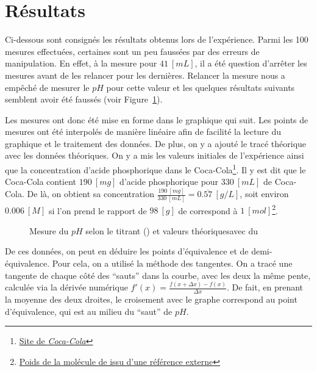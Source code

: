 \documentclass[11pt]{article}
\begin{document}
\section{Résultats}\label{sec:resultats}
Ci-dessous sont consignés les résultats obtenus lors de l'expérience.
Parmi les 100 mesures effectuées, certaines sont un peu faussées par des erreurs de manipulation.
En effet, à la mesure pour $41 \ [mL]$, il a été question d'arrêter les mesures avant de les relancer pour
les dernières.
Relancer la mesure nous a empêché de mesurer le $pH$ pour cette valeur et les quelques résultats suivants
semblent avoir été faussés (voir Figure~\ref{fig:data-plot}).



Les mesures ont donc été mise en forme dans le graphique qui suit.
Les points de mesures ont été interpolés de manière linéaire afin de facilité la lecture du graphique et le
traitement des données.
De plus, on y a ajouté le tracé théorique avec les données théoriques.
On y a mis les valeurs initiales de l'expérience ainsi que la concentration d'acide phosphorique dans le
Coca-Cola\footnote{\href{https://fr.coca-cola.be/developpement-durable/boissons/ingredients/decouvrir-les-ingredients-de-nos-boissons}{Site de \textit{Coca-Cola}}}.
Il y est dit que le Coca-Cola contient $190 \ [mg]$ d'acide phosphorique pour $330 \ [mL]$ de Coca-Cola.
De là, on obtient sa concentration $\frac{190 \ [mg]}{330 \ [mL]} = 0.\overline{57} \ [g/L]$, soit environ
$0.006 \ [M]$ si l'on prend le rapport de $98 \ [g]$ de  correspond à $1 \ [mol]$\footnote{\href{https://www.laboratorynotes.com/molarity-of-85-percent-phosphoric-acid-h3po4/}{Poids de la molécule de  issu d'une référence externe}}.

\begin{figure}[H]
\centering

\caption[Mesure du $pH$ selon le titrant () et valeurs théoriques avec du ]{Mesure
du $pH$ selon le titrant () et valeurs théoriques\protect\footnotemark avec du }
\label{fig:data-plot}
\end{figure}

De ces données, on peut en déduire les points d'équivalence et de demi-équivalence.
Pour cela, on a utilisé la méthode des tangentes.
On a tracé une tangente de chaque côté des ``sauts'' dans la courbe, avec les deux la même pente, calculée
via la dérivée numérique $f'(x) = \frac{f(x + \Delta x) - f(x)}{\Delta x}$.
De fait, en prenant la moyenne des deux droites, le croisement avec le graphe correspond au point d'équivalence,
qui est au milieu du ``saut'' de $pH$\@.
\end{document}
